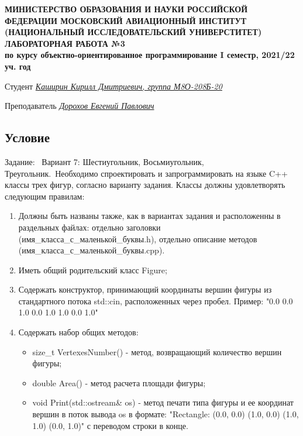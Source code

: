 \documentclass[12pt]{article}
\begin{document}
\begin{titlepage}
\begin{center}
\textbf{МИНИСТЕРСТВО ОБРАЗОВАНИЯ И НАУКИ РОССИЙСКОЙ ФЕДЕРАЦИИ
\medskip
МОСКОВСКИЙ АВИАЦИОННЫЙ ИНСТИТУТ
(НАЦИОНАЛЬНЫЙ ИССЛЕДОВАТЕЛЬСКИЙ УНИВЕРСТИТЕТ)
\vfill\vfill
{\Huge ЛАБОРАТОРНАЯ РАБОТА №3} \\
по курсу объектно-ориентированное программирование
I семестр, 2021/22 уч. год}
\end{center}
\vfill

Студент \uline{\it {Каширин Кирилл Дмитриевич, группа М8О-208Б-20}\hfill}

Преподаватель \uline{\it {Дорохов Евгений Павлович}\hfill}

\vfill
\end{titlepage}

\subsection*{Условие}

Задание: \
Вариант 7: Шестиугольник, Восьмиугольник, Треугольник.\
Необходимо спроектировать и запрограммировать на языке C++ классы трех фигур, согласно варианту задания. Классы должны удовлетворять следующим правилам:
\begin{enumerate}
\item Должны быть названы также, как в вариантах задания и расположенны в раздельных файлах: отдельно заголовки (имя\_класса\_с\_маленькой\_буквы.h), отдельно описание методов (имя\_класса\_с\_маленькой\_буквы.cpp).
\item Иметь общий родительский класс Figure;
\item Содержать конструктор, принимающий координаты вершин фигуры из стандартного потока std::cin, расположенных через пробел. Пример: "0.0 0.0 1.0 0.0 1.0 1.0 0.0 1.0"
\item Содержать набор общих методов:
\begin{itemize}
    \item size\_t VertexesNumber() - метод, возвращающий количество вершин фигуры;
    \item double Area() - метод расчета площади фигуры;
    \item void Print(std::ostream& os) - метод печати типа фигуры и ее координат вершин в поток вывода os в формате: "Rectangle: (0.0, 0.0) (1.0, 0.0) (1.0, 1.0) (0.0, 1.0)" с переводом строки в конце.
\end{itemize}
\end{enumerate}
\end{document}
